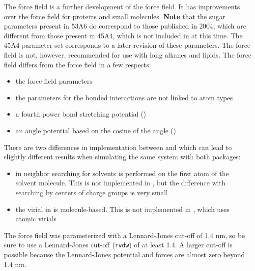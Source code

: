 The  force field is a further development of the  force field.
It has improvements over the  force field for proteins and small molecules.
{\bf Note} that the sugar parameters present in 53A6 do correspond to those published in 
2004\cite{Oostenbrink2004}, which are different from those present in 45A4, which
is not included in {\gromacs} at this time.  The 45A4 parameter set corresponds to a later
revision of these parameters. 
The  force field is not, however, recommended for use with long alkanes and
lipids.  The  force field differs from the 
force field in a few respects:
\begin{itemize}
\item the force field parameters
\item the parameters for the bonded interactions are not linked to atom types
\item a fourth power bond stretching potential ()
\item an angle potential based on the cosine of the angle ()
\end{itemize}
There are two differences in implementation between {\gromacs} and 
which can lead to slightly different results when simulating the same system
with both packages: 
\begin{itemize}
\item in  neighbor searching for solvents is performed on the
first atom of the solvent molecule.  This is not implemented in {\gromacs},
but the difference with searching by centers of charge groups is very small
\item the virial in  is molecule-based. This is not implemented in
{\gromacs}, which uses atomic virials
\end{itemize}
The  force field was parameterized with a Lennard-Jones cut-off
of 1.4 nm, so be sure to use a Lennard-Jones cut-off ({\tt rvdw}) of at least 1.4.
A larger cut-off is possible because the Lennard-Jones potential and forces
are almost zero beyond 1.4 nm.

